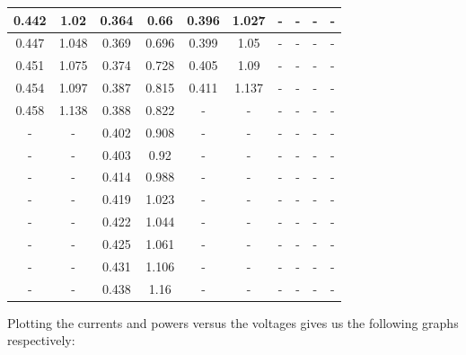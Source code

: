 \documentclass[12pt]{article}
\begin{document}
\begin{center}
\begin{tabular}{|| c c | c c | c c | c c | c c ||}
0.442 & 1.02 & 0.364 & 0.66 & 0.396 & 1.027 & - & - & - & - \\ \hline 
0.447 & 1.048 & 0.369 & 0.696 & 0.399 & 1.05 & - & - & - & - \\ \hline 
0.451 & 1.075 & 0.374 & 0.728 & 0.405 & 1.09 & - & - & - & - \\ \hline 
0.454 & 1.097 & 0.387 & 0.815 & 0.411 & 1.137 & - & - & - & - \\ \hline 
0.458 & 1.138 & 0.388 & 0.822 & - & - & - & - & - & - \\ \hline 
- & - & 0.402 & 0.908 & - & - & - & - & - & - \\ \hline 
- & - & 0.403 & 0.92 & - & - & - & - & - & - \\ \hline 
- & - & 0.414 & 0.988 & - & - & - & - & - & - \\ \hline 
- & - & 0.419 & 1.023 & - & - & - & - & - & - \\ \hline 
- & - & 0.422 & 1.044 & - & - & - & - & - & - \\ \hline 
- & - & 0.425 & 1.061 & - & - & - & - & - & - \\ \hline 
- & - & 0.431 & 1.106 & - & - & - & - & - & - \\ \hline 
- & - & 0.438 & 1.16 & - & - & - & - & - & - \\ \hline 

\end{tabular}
\end{center}

Plotting the currents and powers versus the voltages gives us the following graphs respectively:
\end{document}

